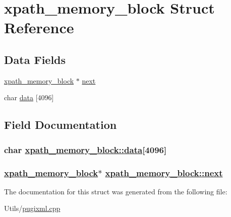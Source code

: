\hypertarget{structxpath__memory__block}{
\section{xpath\_\-memory\_\-block Struct Reference}
\label{structxpath__memory__block}
}
\subsection*{Data Fields}
\begin{CompactItemize}
\item 
\hyperlink{structxpath__memory__block}{xpath\_\-memory\_\-block} $\ast$ \hyperlink{structxpath__memory__block_b7f0d8400b40a51cdb063e76fd19a93c}{next}
\item 
char \hyperlink{structxpath__memory__block_7b00376d0eac172ab537b6b0964858a9}{data} \mbox{[}4096\mbox{]}
\end{CompactItemize}


\subsection{Field Documentation}
\hypertarget{structxpath__memory__block_7b00376d0eac172ab537b6b0964858a9}{
\subsubsection[data]{\setlength{\rightskip}{0pt plus 5cm}char \hyperlink{structxpath__memory__block_7b00376d0eac172ab537b6b0964858a9}{xpath\_\-memory\_\-block::data}\mbox{[}4096\mbox{]}}}
\label{structxpath__memory__block_7b00376d0eac172ab537b6b0964858a9}


\hypertarget{structxpath__memory__block_b7f0d8400b40a51cdb063e76fd19a93c}{
\subsubsection[next]{\setlength{\rightskip}{0pt plus 5cm}\hyperlink{structxpath__memory__block}{xpath\_\-memory\_\-block}$\ast$ \hyperlink{structxpath__memory__block_b7f0d8400b40a51cdb063e76fd19a93c}{xpath\_\-memory\_\-block::next}}}
\label{structxpath__memory__block_b7f0d8400b40a51cdb063e76fd19a93c}




The documentation for this struct was generated from the following file:\begin{CompactItemize}
\item 
Utils/\hyperlink{pugixml_8cpp}{pugixml.cpp}\end{CompactItemize}
